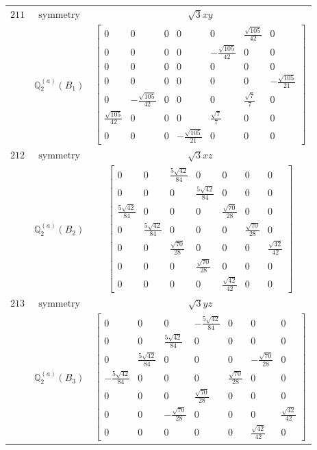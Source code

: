 \documentclass[fleqn,8pt,landscape]{jsarticle}
\begin{document}
\begin{longtable}{ccc}
$ 211 $ & $ \text{symmetry} $ & $ \sqrt{3} x y $ \\
$  $ & $ \mathbb{Q}_{2}^{(a)}(B_{1}) $ & $ \begin{bmatrix} 0 & 0 & 0 & 0 & 0 & \frac{\sqrt{105}}{42} & 0 \\ 0 & 0 & 0 & 0 & - \frac{\sqrt{105}}{42} & 0 & 0 \\ 0 & 0 & 0 & 0 & 0 & 0 & 0 \\ 0 & 0 & 0 & 0 & 0 & 0 & - \frac{\sqrt{105}}{21} \\ 0 & - \frac{\sqrt{105}}{42} & 0 & 0 & 0 & \frac{\sqrt{7}}{7} & 0 \\ \frac{\sqrt{105}}{42} & 0 & 0 & 0 & \frac{\sqrt{7}}{7} & 0 & 0 \\ 0 & 0 & 0 & - \frac{\sqrt{105}}{21} & 0 & 0 & 0 \end{bmatrix} $ \\ \hline
$ 212 $ & $ \text{symmetry} $ & $ \sqrt{3} x z $ \\
$  $ & $ \mathbb{Q}_{2}^{(a)}(B_{2}) $ & $ \begin{bmatrix} 0 & 0 & \frac{5 \sqrt{42}}{84} & 0 & 0 & 0 & 0 \\ 0 & 0 & 0 & \frac{5 \sqrt{42}}{84} & 0 & 0 & 0 \\ \frac{5 \sqrt{42}}{84} & 0 & 0 & 0 & \frac{\sqrt{70}}{28} & 0 & 0 \\ 0 & \frac{5 \sqrt{42}}{84} & 0 & 0 & 0 & \frac{\sqrt{70}}{28} & 0 \\ 0 & 0 & \frac{\sqrt{70}}{28} & 0 & 0 & 0 & \frac{\sqrt{42}}{42} \\ 0 & 0 & 0 & \frac{\sqrt{70}}{28} & 0 & 0 & 0 \\ 0 & 0 & 0 & 0 & \frac{\sqrt{42}}{42} & 0 & 0 \end{bmatrix} $ \\ \hline
$ 213 $ & $ \text{symmetry} $ & $ \sqrt{3} y z $ \\
$  $ & $ \mathbb{Q}_{2}^{(a)}(B_{3}) $ & $ \begin{bmatrix} 0 & 0 & 0 & - \frac{5 \sqrt{42}}{84} & 0 & 0 & 0 \\ 0 & 0 & \frac{5 \sqrt{42}}{84} & 0 & 0 & 0 & 0 \\ 0 & \frac{5 \sqrt{42}}{84} & 0 & 0 & 0 & - \frac{\sqrt{70}}{28} & 0 \\ - \frac{5 \sqrt{42}}{84} & 0 & 0 & 0 & \frac{\sqrt{70}}{28} & 0 & 0 \\ 0 & 0 & 0 & \frac{\sqrt{70}}{28} & 0 & 0 & 0 \\ 0 & 0 & - \frac{\sqrt{70}}{28} & 0 & 0 & 0 & \frac{\sqrt{42}}{42} \\ 0 & 0 & 0 & 0 & 0 & \frac{\sqrt{42}}{42} & 0 \end{bmatrix} $ \\ \hline

\end{longtable}
\end{document}
